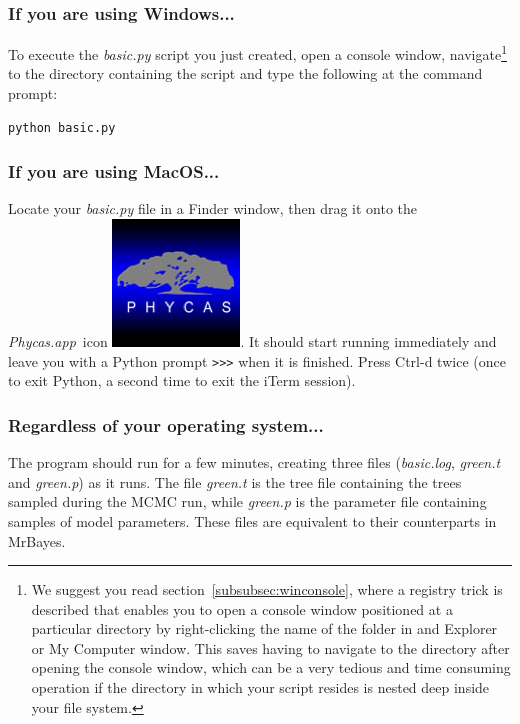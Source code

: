 \documentclass[10pt]{article}
\newcommand{\pathname}[1]{{\em #1}}			%
\newcommand{\keycmd}[1]{{\sf #1}}			%
\newcommand{\code}[1]{{\tt #1}}				%
\newcommand{\phycasapp}{\pathname{Phycas.app}}
\newcommand{\phycasicon}{\includegraphics[scale=0.1]{images/PhycasGUI}}
\begin{document}
\subsubsection{If you are using Windows...} 

To execute the \pathname{basic.py} script you just created, open a console window, navigate\footnote{We suggest you read section~\ref{subsubsec:winconsole}, where a registry trick is described that enables you to open a console window positioned at a particular directory by right-clicking the name of the folder in and Explorer or My Computer window. This saves having to navigate to the directory after opening the console window, which can be a very tedious and time consuming operation if the directory in which your script resides is nested deep inside your file system.} to the directory containing the script and type the following at the command prompt:
%
\begin{verbatim}
python basic.py
\end{verbatim}

\subsubsection{If you are using MacOS...} 

Locate your \pathname{basic.py} file in a Finder window, then drag it onto the \phycasapp\ icon \phycasicon. It should start running immediately and leave you with a Python prompt \code{>>>} when it is finished. Press \keycmd{Ctrl-d} twice (once to exit Python, a second time to exit the iTerm session).

\subsubsection{Regardless of your operating system...} 

The program should run for a few minutes, creating three files (\pathname{basic.log}, \pathname{green.t} and \pathname{green.p}) as it runs. The file \pathname{green.t} is the tree file containing the trees sampled during the MCMC run, while \pathname{green.p} is the parameter file containing samples of model parameters. These files are equivalent to their counterparts in MrBayes.

\end{document}
